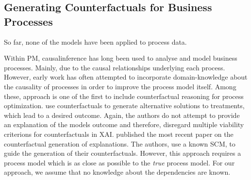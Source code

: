 \documentclass[./../../paper.tex]{subfiles}
\begin{document}
\subsection{Generating Counterfactuals for Business Processes}
So far, none of the models have been applied to process data.

Within \gls{PM}, \gls{causalinference} has long been used to analyse and model business processes. Mainly, due to the causal relationships underlying each process. However, early work has often attempted to incorporate domain-knowledge about the causality of processes in order to improve the process model itself\autocites{shook_AssessmentUseStructural_2004,baker_ClosingLoopEmpirical_2017,hompes_DiscoveringCausalFactors_2017,wang_CounterfactualDataAugmentedSequential_2021}.
Among these, \citeauthor{narendra_CounterfactualReasoningProcess_2019} approach is one of the first to include counterfactual reasoning for process optimization\autocite{narendra_CounterfactualReasoningProcess_2019}.
\citeauthor{oberst_CounterfactualOffPolicyEvaluation_2019} use counterfactuals to generate alternative solutions to treatments, which lead to a desired outcome\autocite{oberst_CounterfactualOffPolicyEvaluation_2019}.
Again, the authors do not attempt to provide an explanation of the models outcome and therefore, disregard multiple viability criterions for counterfactuals in \gls{XAI}. \citeauthor{qafari_CaseLevelCounterfactual_2021} published the most recent paper on the counterfactual generation of explanations\autocite{qafari_CaseLevelCounterfactual_2021}. The authors, use a known \gls{SCM}, to guide the generation of their counterfactuals. However, this approach requires a process model which is as close as possible to the \emph{true} process model. For our approach, we assume that no knowledge about the dependencies are known.
\end{document}

